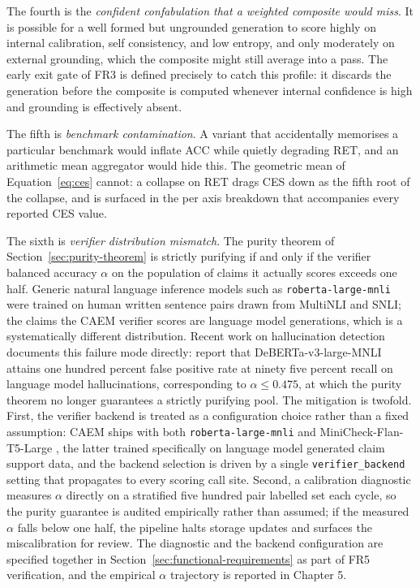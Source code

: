 The fourth is the \emph{confident confabulation that a weighted composite would miss}. It is possible for a well formed but ungrounded generation to score highly on internal calibration, self consistency, and low entropy, and only moderately on external grounding, which the composite might still average into a pass. The early exit gate of FR3 is defined precisely to catch this profile: it discards the generation before the composite is computed whenever internal confidence is high and grounding is effectively absent.

The fifth is \emph{benchmark contamination}. A variant that accidentally memorises a particular benchmark would inflate ACC while quietly degrading RET, and an arithmetic mean aggregator would hide this. The geometric mean of Equation~\ref{eq:ces} cannot: a collapse on RET drags CES down as the fifth root of the collapse, and is surfaced in the per axis breakdown that accompanies every reported CES value.

The sixth is \emph{verifier distribution mismatch}. The purity theorem of Section~\ref{sec:purity-theorem} is strictly purifying if and only if the verifier balanced accuracy $\alpha$ on the population of claims it actually scores exceeds one half. Generic natural language inference models such as \texttt{roberta-large-mnli} were trained on human written sentence pairs drawn from MultiNLI and SNLI; the claims the CAEM verifier scores are language model generations, which is a systematically different distribution. Recent work on hallucination detection documents this failure mode directly: \citet{semanticillusion2025} report that DeBERTa-v3-large-MNLI attains one hundred percent false positive rate at ninety five percent recall on language model hallucinations, corresponding to $\alpha \le 0.475$, at which the purity theorem no longer guarantees a strictly purifying pool. The mitigation is twofold. First, the verifier backend is treated as a configuration choice rather than a fixed assumption: CAEM ships with both \texttt{roberta-large-mnli} and MiniCheck-Flan-T5-Large \citep{tang2024minicheck}, the latter trained specifically on language model generated claim support data, and the backend selection is driven by a single \texttt{verifier\_backend} setting that propagates to every scoring call site. Second, a calibration diagnostic measures $\alpha$ directly on a stratified five hundred pair labelled set each cycle, so the purity guarantee is audited empirically rather than assumed; if the measured $\alpha$ falls below one half, the pipeline halts storage updates and surfaces the miscalibration for review. The diagnostic and the backend configuration are specified together in Section~\ref{sec:functional-requirements} as part of FR5 verification, and the empirical $\alpha$ trajectory is reported in Chapter 5.


